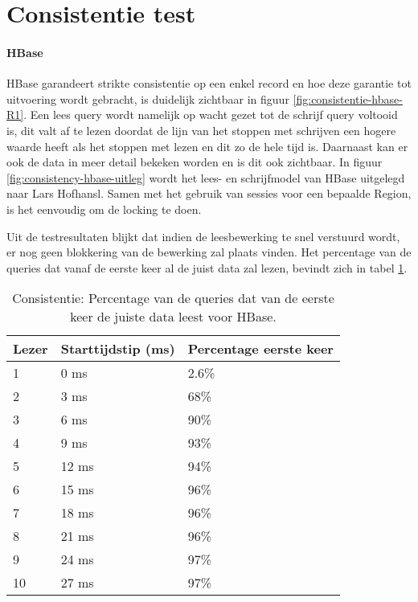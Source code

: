 \section{Consistentie test}
\paragraph{HBase} HBase garandeert strikte consistentie op een enkel record en hoe deze garantie tot uitvoering wordt gebracht, is duidelijk zichtbaar in figuur \ref{fig:consistentie-hbase-R1}. Een lees query wordt namelijk op wacht gezet tot de schrijf query voltooid is, dit valt af te lezen doordat de lijn van het stoppen met schrijven een hogere waarde heeft als het stoppen met lezen en dit zo de hele tijd is. Daarnaast kan er ook de data in meer detail bekeken worden en is dit ook zichtbaar. In figuur \ref{fig:consistency-hbase-uitleg} wordt het lees- en schrijfmodel van HBase uitgelegd naar Lars Hofhansl\cite{hbase-acid}. Samen met het gebruik van sessies voor een bepaalde Region, is het eenvoudig om de locking te doen. 

Uit de testresultaten blijkt dat indien de leesbewerking te snel verstuurd wordt, er nog geen blokkering van de bewerking zal plaats vinden. Het percentage van de queries dat vanaf de eerste keer al de juist data zal lezen, bevindt zich in tabel \ref{table:consistentie-hbase-correct}.



\begin{table}
\centering
\begin{tabular}{l| l l}
	\textbf{Lezer} & \textbf{Starttijdstip (ms)} & \textbf{Percentage eerste keer} \\
	\hline
	1 &  0 ms & 2.6\%\\
	2 &  3 ms & 68\%\\
	3 &  6 ms & 90\%\\
	4 &  9 ms & 93\%\\
	5 &  12 ms & 94\%\\
	6 &  15 ms & 96\%\\
	7 &  18 ms & 96\%\\
	8 &  21 ms & 96\%\\
	9 &  24 ms & 97\%\\
	10 & 27 ms & 97\% 
\end{tabular}
\caption{Consistentie: Percentage van de queries dat van de eerste keer de juiste data leest voor HBase. }
\label{table:consistentie-hbase-correct}
\end{table}

